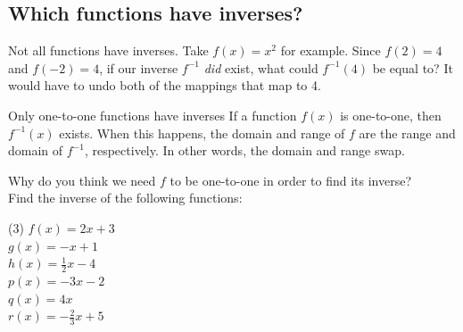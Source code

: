 \documentclass[12pt,fleqn]{book}
\begin{document}
\subsection*{Which functions have inverses?}
Not all functions have inverses.  Take $f(x)=x^2$ for example.  Since $f(2)=4$ and $f(-2)=4$, if our inverse $f^{-1}$ \emph{did} exist, what could $f^{-1}(4)$ be equal to?  It would have to undo both of the mappings that map to 4.
\begin{thm}{Only one-to-one functions have inverses}{}
    If a function $f(x)$ is one-to-one, then $f^{-1}(x)$ exists.  When this happens, the domain and range of $f$ are the range and domain of $f^{-1}$, respectively.  In other words, the domain and range swap.
\end{thm}
Why do you think we need $f$ to be one-to-one in order to find its inverse?
\\[2in]
Find the inverse of the following functions:
\begin{tasks}(3)
    \task $f(x) = 2x + 3 $\\[2in]
    \task $g(x) = -x + 1 $\\[2in]
    \task $h(x) = \tfrac{1}{2}x - 4 $\\[2in]
    \task $p(x) = -3x - 2 $\\[2in]
    \task $q(x) = 4x $\\[2in]
    \task $r(x) = -\tfrac{2}{3}x + 5$\\[2in]
\end{tasks}
\end{document}
